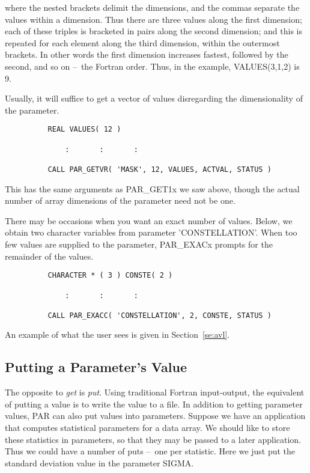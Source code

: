 \documentclass[twoside,11pt]{article}
\newcommand{\xlabel}[1]{}
\newcommand{\dash}{--}
\newcommand{\dash}{-}
\begin{document}
where the nested brackets delimit the dimensions, and the commas
separate the values within a dimension.  Thus there are three values
along the first dimension; each of these triples is bracketed in pairs
along the second dimension; and this is repeated for each element along
the third dimension, within the outermost brackets.  In other words the
first dimension increases fastest, followed by the second, and so
on \dash\ the Fortran order.  Thus, in the example, VALUES(3,1,2) is 9. 

Usually, it will suffice to get a vector of values disregarding
the dimensionality of the parameter.

\begin{verbatim}
          REAL VALUES( 12 )

              :       :       :

          CALL PAR_GETVR( 'MASK', 12, VALUES, ACTVAL, STATUS )
\end{verbatim}

This has the same arguments as PAR\_GET1x we saw above, though the actual
number of array dimensions of the parameter need not be one.

There may be occasions when you want an exact number of values. 
Below, we obtain two character variables from parameter 'CONSTELLATION'.
When too few values are supplied to the parameter, PAR\_EXACx
prompts for the remainder of the values.

\begin{verbatim}
          CHARACTER * ( 3 ) CONSTE( 2 )

              :       :       :

          CALL PAR_EXACC( 'CONSTELLATION', 2, CONSTE, STATUS )
\end{verbatim}

An example of what the user sees is given in Section~\ref{se:avl}.

\subsection{\xlabel{putting_a_parameters_value}Putting a Parameter's Value}

The opposite to {\em get\/} is {\em put}.  Using traditional Fortran
input-output, the equivalent of putting a value is to write the value to
a file.  In addition to getting parameter values, PAR can also put
values into parameters.  Suppose we have an application that computes
statistical parameters for a data array.  We should like to store these
statistics in parameters, so that they may be passed to a later
application.  Thus we could have a number of puts \dash\ one per statistic.
Here we just put the standard deviation value in the parameter SIGMA. 
\end{document}
